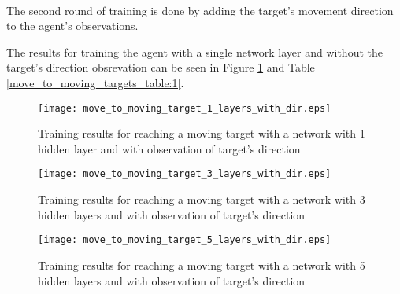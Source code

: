 \paragraph{}
The second round of training is done by adding the target's movement direction to the agent's observations.

The results for training the agent with a single network layer and without the target's direction obsrevation can be seen in Figure \ref{train_results_moving_1_layers_with_dir} and Table \ref{move_to_moving_targets_table:1}.

\begin{figure}
    \begin{center}
        \texttt{[image: move\_to\_moving\_target\_1\_layers\_with\_dir.eps]}
        \caption{Training results for reaching a moving target with a network with 1 hidden layer and with observation of target's direction}
        \label{train_results_moving_1_layers_with_dir}
    \end{center}
\end{figure}

\begin{figure}
    \begin{center}
        \texttt{[image: move\_to\_moving\_target\_3\_layers\_with\_dir.eps]}
        \caption{Training results for reaching a moving target with a network with 3 hidden layers and with observation of target's direction}
        \label{train_results_moving_3_layers_with_dir}
    \end{center}
\end{figure}

\begin{figure}
    \begin{center}
        \texttt{[image: move\_to\_moving\_target\_5\_layers\_with\_dir.eps]}
        \caption{Training results for reaching a moving target with a network with 5 hidden layers and with observation of target's direction}
        \label{train_results_moving_5_layers_with_dir}
    \end{center}
\end{figure}



